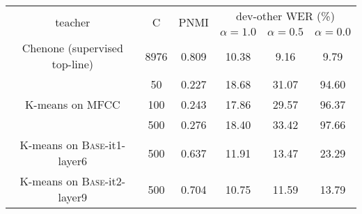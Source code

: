 
\begin{tabular}{cc|c|ccc}
    \toprule
    \multirow{2}{*}{teacher} & \multirow{2}{*}{C} & 
    \multirow{2}{*}{PNMI} &
    \multicolumn{3}{c}{dev-other WER (\%)} \\
    & & & $\alpha = 1.0$ & $\alpha = 0.5$ & $\alpha = 0.0$ \\
    \midrule\midrule
    Chenone (supervised top-line)  & 8976 & 0.809 & 10.38 & 9.16 & 9.79 \\
    \midrule
    \multirow{3}{*}{K-means on MFCC} 
    & 50  & 0.227 & 18.68 & 31.07 & 94.60 \\
    & 100 & 0.243 & 17.86 & 29.57 & 96.37 \\
    & 500 & 0.276 & 18.40 & 33.42 & 97.66 \\
    \midrule
    K-means on \textsc{Base}-it1-layer6 & 500 & 0.637 & 11.91 & 13.47 & 23.29 \\
    K-means on \textsc{Base}-it2-layer9 & 500 & 0.704 & 10.75 & 11.59 & 13.79 \\
    \bottomrule
\end{tabular}